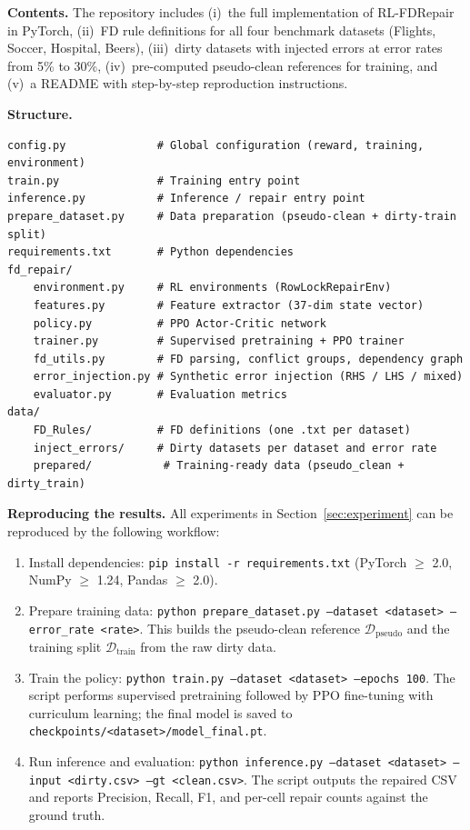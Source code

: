 \documentclass[sigconf]{acmart}
\begin{document}
\noindent\textbf{Contents.}
The repository includes (i)~the full implementation of RL-FDRepair in PyTorch, (ii)~FD rule definitions for all four benchmark datasets (Flights, Soccer, Hospital, Beers), (iii)~dirty datasets with injected errors at error rates from 5\% to 30\%, (iv)~pre-computed pseudo-clean references for training, and (v)~a README with step-by-step reproduction instructions.

\noindent\textbf{Structure.}
\begin{verbatim}
config.py              # Global configuration (reward, training, environment)
train.py               # Training entry point
inference.py           # Inference / repair entry point
prepare_dataset.py     # Data preparation (pseudo-clean + dirty-train split)
requirements.txt       # Python dependencies
fd_repair/
    environment.py     # RL environments (RowLockRepairEnv)
    features.py        # Feature extractor (37-dim state vector)
    policy.py          # PPO Actor-Critic network
    trainer.py         # Supervised pretraining + PPO trainer
    fd_utils.py        # FD parsing, conflict groups, dependency graph
    error_injection.py # Synthetic error injection (RHS / LHS / mixed)
    evaluator.py       # Evaluation metrics
data/
    FD_Rules/          # FD definitions (one .txt per dataset)
    inject_errors/     # Dirty datasets per dataset and error rate
    prepared/           # Training-ready data (pseudo_clean + dirty_train)
\end{verbatim}

\noindent\textbf{Reproducing the results.}
All experiments in Section~\ref{sec:experiment} can be reproduced by the following workflow:
\begin{enumerate}
\item Install dependencies: \texttt{pip install -r requirements.txt} (PyTorch $\ge$ 2.0, NumPy $\ge$ 1.24, Pandas $\ge$ 2.0).
\item Prepare training data: \texttt{python prepare\_dataset.py --dataset <dataset> --error\_rate <rate>}. This builds the pseudo-clean reference $\mathcal{D}_{\text{pseudo}}$ and the training split $\mathcal{D}_{\text{train}}$ from the raw dirty data.
\item Train the policy: \texttt{python train.py --dataset <dataset> --epochs 100}. The script performs supervised pretraining followed by PPO fine-tuning with curriculum learning; the final model is saved to \texttt{checkpoints/<dataset>/model\_final.pt}.
\item Run inference and evaluation: \texttt{python inference.py --dataset <dataset> --input <dirty.csv> --gt <clean.csv>}. The script outputs the repaired CSV and reports Precision, Recall, F1, and per-cell repair counts against the ground truth.
\end{enumerate}
\end{document}
